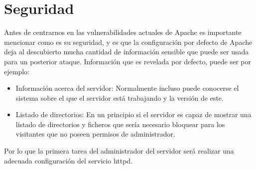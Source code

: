 \documentclass[a4paper, 10pt]{article} %
\begin{document}
\section{Seguridad}
Antes de centrarnos en las vulnerabilidades actuales de Apache es importante mencionar como es su seguridad, y es que la configuración por defecto de Apache deja al descubierto mucha cantidad de información sensible que puede ser usada para un posterior ataque. Información que es revelada por defecto, puede ser por ejemplo:
\begin{itemize}
	\item Información acerca del servidor: Normalmente incluso puede conocerse el sistema sobre el que el servidor está trabajando y la versión de este.
	\item Listado de directorios: En un principio si el servidor es capaz de mostrar una listado de directorios y ficheros que sería necesario bloquear para los visitantes que no poseen permisos de administrador.
\end{itemize}
Por lo que la primera tarea del administrador del servidor será realizar una adecuada configuración del servicio httpd. 
\end{document}
